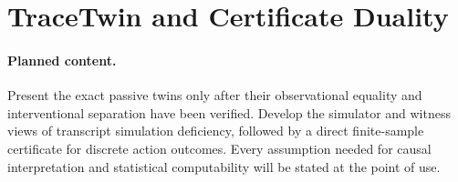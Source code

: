 \section{TraceTwin and Certificate Duality}
\label{sec:tracetwin-duality}

\paragraph{Planned content.}
Present the exact passive twins only after their observational equality and
interventional separation have been verified. Develop the simulator and
witness views of transcript simulation deficiency, followed by a direct
finite-sample certificate for discrete action outcomes. Every assumption
needed for causal interpretation and statistical computability will be stated
at the point of use.
